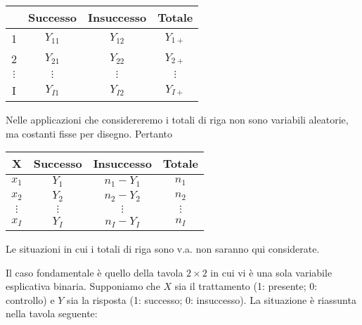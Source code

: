 \begin{center}
\begin{tabular}{cccc}
  \hline
    & Successo & Insuccesso & Totale \\
  \hline
  1 & $Y_{11}$ & $Y_{12}$ & $Y_{1+}$ \\
  2 & $Y_{21}$ & $Y_{22}$ & $Y_{2+}$ \\
  $\vdots$ & $\vdots$ & $\vdots$ & $\vdots$ \\
  I & $Y_{I1}$ & $Y_{I2}$ & $Y_{I+}$ \\
  \hline
\end{tabular}
\end{center}
Nelle applicazioni che considereremo i totali di riga non sono variabili aleatorie, ma costanti fisse per disegno. 
Pertanto
\begin{center}
\begin{tabular}{cccc}
  \hline
  X & Successo & Insuccesso & Totale \\
  \hline
  $x_1$    & $Y_{1}$ & $n_1-Y_1$ & $n_1$ \\
  $x_2$    & $Y_{2}$ & $n_2-Y_2$ & $n_2$ \\
  $\vdots$ & $\vdots$ & $\vdots$ & $\vdots$ \\
  $x_I$    & $Y_{I}$ & $n_I-Y_{I}$ & $n_I$ \\
  \hline
\end{tabular}
\end{center}
Le situazioni in cui i totali di riga sono v.a. non saranno qui considerate.

Il caso fondamentale è quello della tavola $2 \times 2$ in cui vi è una sola variabile esplicativa binaria.
Supponiamo che $X$ sia il trattamento (1: presente; 0: controllo) e $Y$ sia la risposta (1: successo; 0: insuccesso).
La situazione è riassunta nella tavola seguente:

